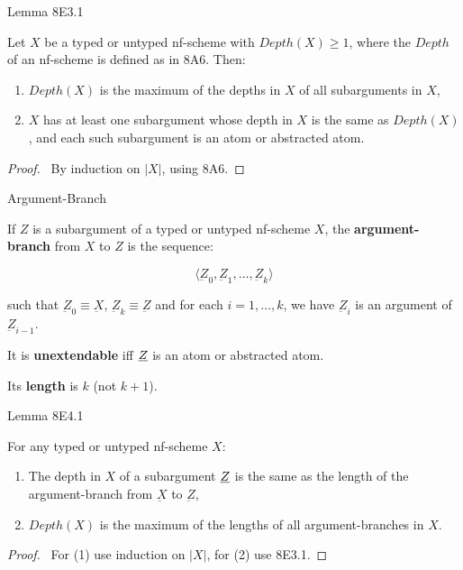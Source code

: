\begin{frame}{Lemma 8E3.1}

\begin{lemma}[8E3.1 in Hindley's]
Let $X$ be a typed or untyped nf-scheme with $Depth(X) \geq 1$, where the $Depth$ of an nf-scheme is defined as in 8A6. Then: 
\begin{enumerate}
\item $Depth(X)$ is the maximum of the depths in $X$ of all subarguments in $X$, 
\item $X$ has at least one subargument whose depth in $X$ is the same as $Depth(X)$, and each such subargument is an atom or abstracted atom. 
\end{enumerate} 
\end{lemma}

\begin{proof}
\pfsketch \ By induction on $|X|$, using 8A6. 
\end{proof} 
\end{frame} 

\begin{frame}{Argument-Branch}
\begin{mydef}[8E4 in Hindley's]
If $Z$ is a subargument of a typed or untyped nf-scheme $X$, the \textbf{argument-branch} from $X$ to $Z$ is the sequence: 

\begin{equation*}
\langle \underbar{Z}_0, \underbar{Z}_1, \ldots, \underbar{Z}_k  \rangle
\end{equation*}

such that $\underbar{Z}_0 \equiv \underbar{X}$, $\underbar{Z}_k \equiv \underbar{Z}$ and for each $i = 1, \ldots, k$, we have   $\underbar{Z}_i$ is an argument of $\underbar{Z}_{i-1}$.

\medskip

It is \textbf{unextendable} iff $\underbar{$Z$}$ is an atom or abstracted atom. 

\medskip 

Its \textbf{length} is $k$ (not $k+1$). 
\end{mydef}
    
\end{frame}

\begin{frame}{Lemma 8E4.1}
\begin{lemma}[8E4.1 in Hindley's]
For any typed or untyped nf-scheme $X$:
\begin{enumerate}
\item The depth in $X$ of a subargument $\underbar{$Z$}$ is the same as the length of the argument-branch from $\underbar{X}$ to $\underbar{Z}$, 
\item $Depth(X)$ is the maximum of the lengths of all argument-branches in $X$. 
\end{enumerate}
\end{lemma}

\begin{proof}
\pfsketch \ For (1) use induction on $|X|$, for (2) use 8E3.1.  
\end{proof}
\end{frame}

